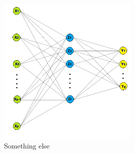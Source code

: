 \documentclass[12pt,]{article}
\begin{document}
\begin{figure}
\centering
\includegraphics[width=0.6\textwidth,height=\textheight]{figures/nnet.png}
\caption{Something else}
\end{figure}
\end{document}
